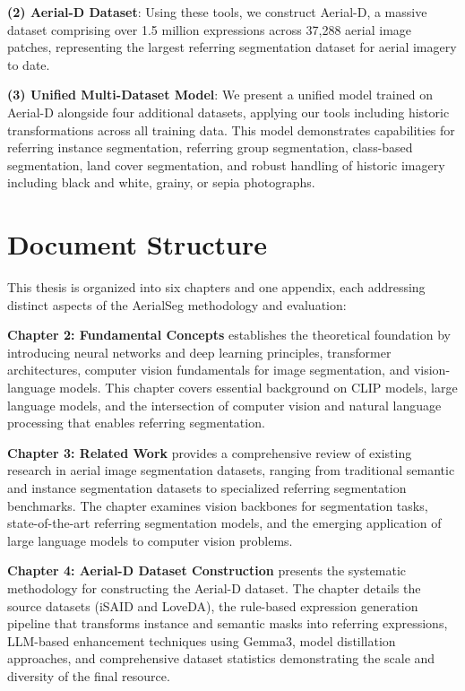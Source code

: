 \textbf{(2) Aerial-D Dataset}: Using these tools, we construct Aerial-D, a massive dataset comprising over 1.5 million expressions across 37,288 aerial image patches, representing the largest referring segmentation dataset for aerial imagery to date.

\textbf{(3) Unified Multi-Dataset Model}: We present a unified model trained on Aerial-D alongside four additional datasets, applying our tools including historic transformations across all training data. This model demonstrates capabilities for referring instance segmentation, referring group segmentation, class-based segmentation, land cover segmentation, and robust handling of historic imagery including black and white, grainy, or sepia photographs.
\section{Document Structure}

This thesis is organized into six chapters and one appendix, each addressing distinct aspects of the AerialSeg methodology and evaluation:

\textbf{Chapter 2: Fundamental Concepts} establishes the theoretical foundation by introducing neural networks and deep learning principles, transformer architectures, computer vision fundamentals for image segmentation, and vision-language models. This chapter covers essential background on CLIP models, large language models, and the intersection of computer vision and natural language processing that enables referring segmentation.

\textbf{Chapter 3: Related Work} provides a comprehensive review of existing research in aerial image segmentation datasets, ranging from traditional semantic and instance segmentation datasets to specialized referring segmentation benchmarks. The chapter examines vision backbones for segmentation tasks, state-of-the-art referring segmentation models, and the emerging application of large language models to computer vision problems.

\textbf{Chapter 4: Aerial-D Dataset Construction} presents the systematic methodology for constructing the Aerial-D dataset. The chapter details the source datasets (iSAID and LoveDA), the rule-based expression generation pipeline that transforms instance and semantic masks into referring expressions, LLM-based enhancement techniques using Gemma3, model distillation approaches, and comprehensive dataset statistics demonstrating the scale and diversity of the final resource.

